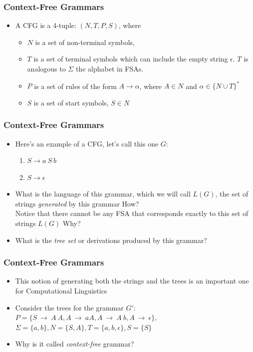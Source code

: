 \begin{frame}
\frametitle{Context-Free Grammars}
\begin{itemize}
\item A CFG is a 4-tuple: $(N, T, P, S)$, where 
\begin{itemize}
\item $N$ is a set of non-terminal symbols, 
\item $T$ is a set of terminal symbols which can include the empty
  string $\epsilon$. $T$ is analogous to $\Sigma$ the alphabet in FSAs.
\item $P$ is a set of rules of the form $A \rightarrow \alpha$, where $A \in N$ and $\alpha \in \{ N \cup T \}^\ast$
\item $S$ is a set of start symbols, $S \in N$
\end{itemize}
\end{itemize}

\end{frame}

\begin{frame}
\frametitle{Context-Free Grammars}
\begin{itemize}
\item Here's an example of a CFG, let's call this one $G$:
\begin{enumerate}
\item $S \rightarrow a\ S\ b$
\item $S \rightarrow \epsilon$
\end{enumerate}
\item What is the language of this grammar, which we will call $L(G)$, the set of strings {\em generated} by this grammar {\color{red} How?} \\
Notice that there cannot be any FSA that corresponds exactly to this set of strings $L(G)$ {\color{red} Why?}
\item What is the {\em tree set} or derivations produced by this grammar?
\end{itemize}

\end{frame}

\begin{frame}
\frametitle{Context-Free Grammars}
\begin{itemize}
\item This notion of generating both the strings and the trees is an important one for Computational Linguistics
\item Consider the trees for the grammar $G'$: $P = \{S~\rightarrow~A~A, A~\rightarrow~a A, A~\rightarrow~A~b, A~\rightarrow~\epsilon \}, $\\
$\Sigma = \{a,b\}, N = \{S,A\}, T = \{a,b,\epsilon\}, S=\{S\}$

\item Why is it called {\em context-free} grammar?
\end{itemize}

\end{frame}

